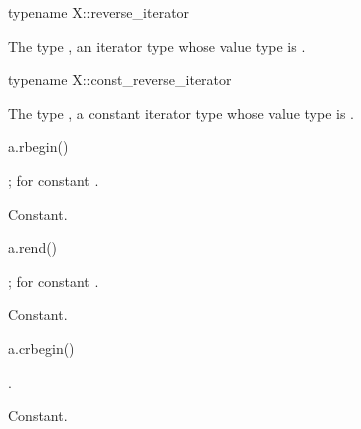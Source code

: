 %
\begin{itemdecl}
typename X::reverse_iterator
\end{itemdecl}

\begin{itemdescr}
\pnum
\result
The type ,
an iterator type whose value type is .
\end{itemdescr}

%
\begin{itemdecl}
typename X::const_reverse_iterator
\end{itemdecl}

\begin{itemdescr}
\pnum
\result
The type ,
a constant iterator type whose value type is .
\end{itemdescr}

%
\begin{itemdecl}
a.rbegin()
\end{itemdecl}

\begin{itemdescr}
\pnum
\result
{};
 for constant .

\pnum
\returns
{}

\pnum
\complexity
Constant.
\end{itemdescr}

%
\begin{itemdecl}
a.rend()
\end{itemdecl}

\begin{itemdescr}
\pnum
\result
{};
 for constant .

\pnum
\returns
{}

\pnum
\complexity
Constant.
\end{itemdescr}

%
\begin{itemdecl}
a.crbegin()
\end{itemdecl}

\begin{itemdescr}
\pnum
\result
{}.

\pnum
\returns
{}

\pnum
\complexity
Constant.
\end{itemdescr}

